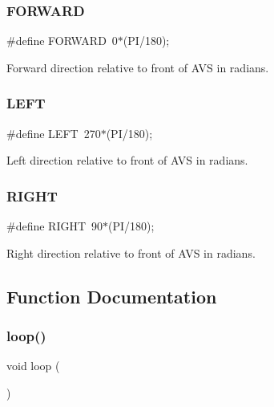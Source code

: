 \subsubsection{\texorpdfstring{F\+O\+R\+W\+A\+RD}{FORWARD}}
{\footnotesize\ttfamily \#define F\+O\+R\+W\+A\+RD~0$\ast$(PI/180);}



Forward direction relative to front of A\+VS in radians. 

\mbox{\label{bot_main_8ino_a437ef08681e7210d6678427030446a54}} 
\subsubsection{\texorpdfstring{L\+E\+FT}{LEFT}}
{\footnotesize\ttfamily \#define L\+E\+FT~270$\ast$(PI/180);}



Left direction relative to front of A\+VS in radians. 

\mbox{\label{bot_main_8ino_a80fb826a684cf3f0d306b22aa100ddac}} 
\subsubsection{\texorpdfstring{R\+I\+G\+HT}{RIGHT}}
{\footnotesize\ttfamily \#define R\+I\+G\+HT~90$\ast$(PI/180);}



Right direction relative to front of A\+VS in radians. 



\subsection{Function Documentation}
\mbox{\label{bot_main_8ino_afe461d27b9c48d5921c00d521181f12f}} 
\subsubsection{\texorpdfstring{loop()}{loop()}}
{\footnotesize\ttfamily void loop (\begin{DoxyParamCaption}{ }\end{DoxyParamCaption})}

